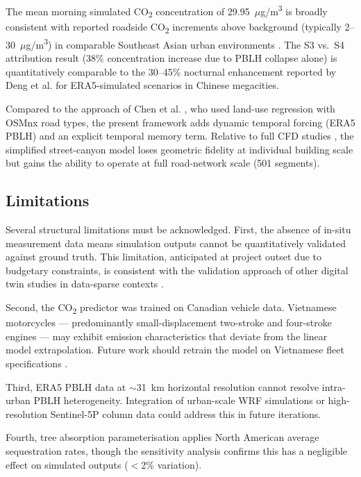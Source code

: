 \documentclass[12pt,a4paper]{article}
\begin{document}
The mean morning simulated CO\textsubscript{2} concentration of 29.95~$\mu$g/m\textsuperscript{3} is broadly consistent with reported roadside CO\textsubscript{2} increments above background (typically 2--30~$\mu$g/m\textsuperscript{3}) in comparable Southeast Asian urban environments \cite{Kumar2020}. The S3 vs.\ S4 attribution result (38\% concentration increase due to PBLH collapse alone) is quantitatively comparable to the 30--45\% nocturnal enhancement reported by Deng et al. \cite{Deng2023} for ERA5-simulated scenarios in Chinese megacities.

Compared to the approach of Chen et al. \cite{Chen2022}, who used land-use regression with OSMnx road types, the present framework adds dynamic temporal forcing (ERA5 PBLH) and an explicit temporal memory term. Relative to full CFD studies \cite{GromkeRuck2007,Tominaga2011}, the simplified street-canyon model loses geometric fidelity at individual building scale but gains the ability to operate at full road-network scale (501 segments).

\subsection{Limitations}
\label{sec:limitations}

Several structural limitations must be acknowledged. First, the absence of in-situ measurement data means simulation outputs cannot be quantitatively validated against ground truth. This limitation, anticipated at project outset due to budgetary constraints, is consistent with the validation approach of other digital twin studies in data-sparse contexts \cite{Fuller2020}.

Second, the CO\textsubscript{2} predictor was trained on Canadian vehicle data. Vietnamese motorcycles --- predominantly small-displacement two-stroke and four-stroke engines --- may exhibit emission characteristics that deviate from the linear model extrapolation. Future work should retrain the model on Vietnamese fleet specifications \cite{MoT2022}.

Third, ERA5 PBLH data at $\sim$31~km horizontal resolution cannot resolve intra-urban PBLH heterogeneity. Integration of urban-scale WRF simulations or high-resolution Sentinel-5P column data could address this in future iterations.

Fourth, tree absorption parameterisation \cite{Nowak2013} applies North American average sequestration rates, though the sensitivity analysis confirms this has a negligible effect on simulated outputs ($<$2\% variation).
\end{document}
